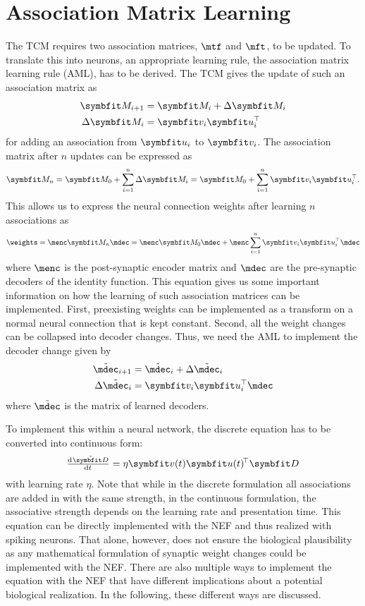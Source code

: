 \chapter{Association Matrix Learning}\label{sec:aml}

The TCM requires two association matrices, $\mtf$ and $\mft$, to be updated.
To translate this into neurons, an appropriate learning rule, the association matrix learning rule (AML), has to be derived.
The TCM gives the update of such an association matrix as
\begin{align}
    \mat M_{i+1} &= \mat M_i + \Delta \mat M_i \\
    \Delta \mat M_i &= \vc v_i \vc u_i\Tr
\end{align}
for adding an association from $\vc u_i$ to $\vc v_i$.
The association matrix after $n$ updates can be expressed as
\begin{equation}
    \mat M_n = \mat M_0 + \sum_{i=1}^{n} \Delta \mat M_i = \mat M_0 + \sum_{i=1}^n \vc v_i \vc u_i\Tr \text{.}
\end{equation}
This allows us to express the neural connection weights after learning $n$ associations as
\begin{equation}
    \weights = \menc \mat M_n \mdec = \menc \mat M_0 \mdec + \menc \sum_{i=1}^n \vc v_i \vc u_i\Tr \mdec
\end{equation}
where $\menc$ is the post-synaptic encoder matrix and $\mdec$ are the pre-synaptic decoders of the identity function.
This equation gives us some important information on how the learning of such association matrices can be implemented.
First, preexisting weights can be implemented as a transform on a normal neural connection that is kept constant.
Second, all the weight changes can be collapsed into decoder changes.
Thus, we need the AML to implement the decoder change given by
\begin{align}
    \tilde{\mdec}_{i+1} &= \tilde{\mdec}_i + \Delta \tilde{\mdec}_i \\
    \Delta \tilde{\mdec}_i &= \vc v_i \vc u_i\Tr \mdec
\end{align}
where $\tilde{\mdec}$ is the matrix of learned decoders.

To implement this within a neural network, the discrete equation has to be converted into continuous form:
\begin{equation}
    \od{\tilde{\mat D}}{t} = \eta \vc v(t) \vc u(t)\!\Tr \mat D \label{eqn:aml}
\end{equation}
with learning rate $\eta$.
Note that while in the discrete formulation all associations are added in with the same strength, in the continuous formulation, the associative strength depends on the learning rate and presentation time.
This equation can be directly implemented with the NEF and thus realized with spiking neurons.
That alone, however, does not ensure the biological plausibility as any mathematical formulation of synaptic weight changes could be implemented with the NEF\@.
There are also multiple ways to implement the equation with the NEF that have different implications about a potential biological realization.
In the following, these different ways are discussed.


